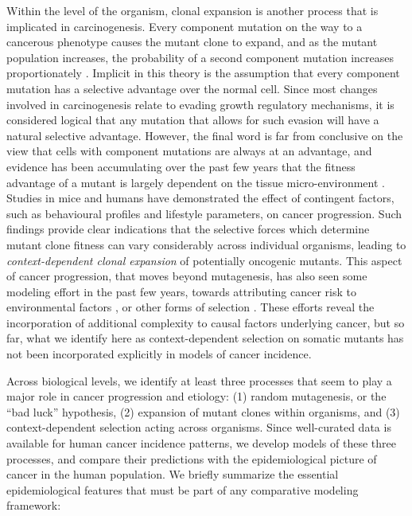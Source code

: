 \documentclass[9pt,twocolumn,twoside]{pnas-new}
\begin{document}
Within the level of the organism, clonal expansion is another process that is implicated in carcinogenesis. Every component mutation on the way to a cancerous phenotype causes the mutant clone to expand, and as the mutant population increases, the probability of a second component mutation increases proportionately \cite{Nowell1976}. Implicit in this theory is the assumption that every component mutation has a selective advantage over the normal cell. Since most changes involved in carcinogenesis relate to evading growth regulatory mechanisms, it is considered logical that any mutation that allows for such evasion will have a natural selective advantage. However, the final word is far from conclusive on the view that cells with component mutations are always at an advantage, and evidence has been accumulating over the past few years that the fitness advantage of a mutant is largely dependent on the tissue micro-environment \cite{Hanahan2012, Pietras2010}. Studies in mice \cite{Cao2010} and humans \cite{Rundqvist2013} have demonstrated the effect of contingent factors, such as behavioural profiles and lifestyle parameters, on cancer progression. Such findings provide clear indications that the selective forces which determine mutant clone fitness can vary considerably across individual organisms, leading to \textit{context-dependent clonal expansion} of potentially oncogenic mutants. This aspect of cancer progression, that moves beyond mutagenesis, has also seen some modeling effort in the past few years, towards attributing cancer risk to environmental factors \cite{Hochberg2017}, or other forms of selection \cite{Nagy2007, Caulin2011}. These efforts reveal the incorporation of additional complexity to causal factors underlying cancer, but so far, what we identify here as context-dependent selection on somatic mutants has not been incorporated explicitly in models of cancer incidence.

Across biological levels, we identify at least three processes that seem to play a major role in cancer progression and etiology: (1) random mutagenesis, or the ``bad luck'' hypothesis, (2) expansion of mutant clones within organisms, and (3) context-dependent selection acting across organisms. Since well-curated data is available for human cancer incidence patterns, we develop models of these three processes, and compare their predictions with the epidemiological picture of cancer in the human population. We briefly summarize the essential epidemiological features that must be part of any comparative modeling framework:
\end{document}
